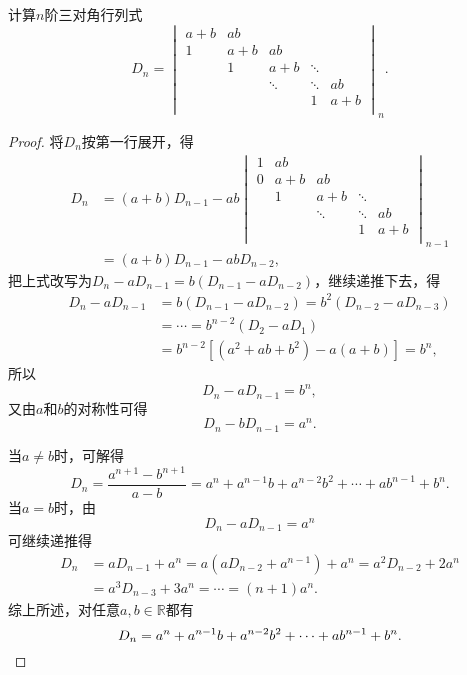 \begin{example}
计算\(n\)阶三对角行列式\begin{equation}
D_n = \begin{vmatrix}
a+b & ab & \\
1 & a+b & ab & \\
 & 1 & a + b & \ddots & \\
 & & \ddots & \ddots & ab \\
 & & & 1 & a+b \\
\end{vmatrix}_n.
\end{equation}
\begin{proof}
将\(D_n\)按第一行展开，得\begin{align*}
D_n &= (a+b) D_{n-1} - ab \begin{vmatrix}
1 & ab \\
0 & a+b & ab \\
 & 1 & a+b & \ddots \\
 & & \ddots & \ddots & ab \\
 & & & 1 & a+b \\
\end{vmatrix}_{n-1} \\
&= (a+b) D_{n-1} - ab D_{n-2},
\end{align*}
把上式改写为\(D_n - a D_{n-1} = b(D_{n-1} - a D_{n-2})\)，继续递推下去，得\begin{align*}
D_n - a D_{n-1} &= b(D_{n-1} - a D_{n-2}) = b^2(D_{n-2} - a D_{n-3}) \\
&= \dotsb = b^{n-2}(D_2 - a D_1) \\
&= b^{n-2} [(a^2 + ab + b^2) - a(a+b)] = b^n,
\end{align*}所以\[
D_n - a D_{n-1} = b^n,
\]又由\(a\)和\(b\)的对称性可得\[
D_n - b D_{n-1} = a^n.
\]

当\(a \neq b\)时，可解得\[
D_n = \frac{a^{n+1} - b^{n+1}}{a - b}
= a^n + a^{n-1} b + a^{n-2} b^2 + \dotsb + a b^{n-1} + b^n.
\]当\(a = b\)时，由\[
D_n - a D_{n-1} = a^n
\]可继续递推得\begin{align*}
D_n &= a D_{n-1} + a^n
= a(a D_{n-2} + a^{n-1}) + a^n
= a^2 D_{n-2} + 2 a^n \\
&= a^3 D_{n-3} + 3 a^n
= \dotsb
= (n+1) a^n.
\end{align*}
综上所述，对任意\(a,b\in\mathbb{R}\)都有\[
D_n = a^n + a^{n-1} b + a^{n-2} b^2 + \dotsb + a b^{n-1} + b^n.
\qedhere
\]
\end{proof}
\end{example}

